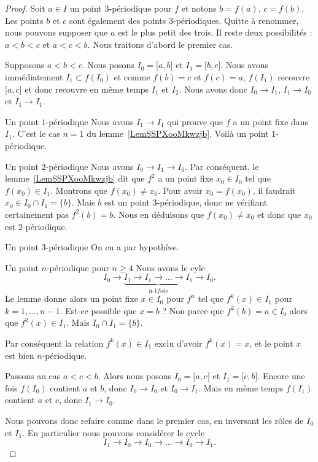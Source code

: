 \begin{proof}
	Soit \( a\in I\) un point \( 3\)-périodique pour \( f\) et notons \( b=f(a)\), \( c=f(b)\). Les points \( b\) et \( c\) sont également des points \( 3\)-périodiques. Quitte à renommer, nous pouvons supposer que \( a\) est le plus petit des trois. Il reste deux possibilités : \( a<b<c\) et \( a<c<b\). Nous traitons d'abord le premier cas.

	Supposons \( a<b<c\). Nous posons \( I_0=\mathopen[ a , b \mathclose]\) et \( I_1=\mathopen[ b , c \mathclose]\). Nous avons immédiatement \( I_1\subset f(I_0)\) et comme \( f(b)=c\) et \( f(c)=a\), \( f(I_1)\) recouvre \( \mathopen[ a , c \mathclose]\) et donc recouvre en même temps \( I_1\) et \( I_2\). Nous avons donc \( I_0\to I_1\), \( I_1\to I_0\) et \( I_1\to I_1\).
	\begin{subproof}
		\item[Un point \( 1\)-périodique]
		Nous avons \( I_1\to I_1\) qui prouve que \( f\) a un point fixe dans \( I_1\). C'est le cas \( n=1\) du lemme~\ref{LemSSPXooMkwzjb}. Voilà un point \( 1\)-périodique.
		\item[Un point \( 2\)-périodique]
		Nous avons \( I_0\to I_1\to I_0\). Par conséquent, le lemme~\ref{LemSSPXooMkwzjb} dit que \( f^2\) a un point fixe \( x_0\in I_0\) tel que \( f(x_0)\in I_1\). Montrons que \( f(x_0)\neq x_0\). Pour avoir \( x_0=f(x_0)\), il faudrait \( x_0\in I_0\cap I_1=\{ b \}\). Mais \( b\) est un point \( 3\)-périodique, donc ne vérifiant certainement pas \( f^2(b)=b\). Nous en déduisons que \( f(x_0)\neq x_0\) et donc que \( x_0\) est \( 2\)-périodique.
		\item[Un point \( 3\)-périodique]
		On en a par hypothèse.
		\item[Un point \( n\)-périodique pour \( n\geq 4\)]
		Nous avons le cyle
		\begin{equation}
			I_0\to \underbrace{I_1\to I_1\to\ldots\to I_1}_{\text{n-1} fois}\to I_0.
		\end{equation}
		Le lemme donne alors un point fixe \( x\in I_0\) pour \( f^n\) tel que \( f^k(x)\in I_1\) pour \( k=1,\ldots, n-1\). Est-ce possible que \( x=b\) ? Non parce que \( f^2(b)=a\in I_0\) alors que \( f^2(x)\in I_1\). Mais \( I_0\cap I_1=\{ b \}\).

		Par conséquent la relation \( f^k(x)\in I_1\) exclu d'avoir \( f^k(x)=x\), et le point \( x\) est bien \( n\)-périodique.
	\end{subproof}

	Passons au cas \( a<c<b\). Alors nous posons \( I_0=\mathopen[ a , c \mathclose]\) et \( I_1=\mathopen[ c , b \mathclose]\). Encore une fois \( f(I_0)\) contient \( a\) et \( b\), donc \( I_0\to I_0\) et \( I_0\to I_1\). Mais en même temps \( f(I_1)\) contient \( a\) et \( c\), donc \( I_1\to I_0\).

	Nous pouvons donc refaire comme dans le premier cas, en inversant les rôles de \( I_0\) et \( I_1\). En particulier nous pouvons considérer le cycle
	\begin{equation}
		I_1\to I_0\to I_0\to\ldots\to I_0\to I_1.
	\end{equation}
\end{proof}
